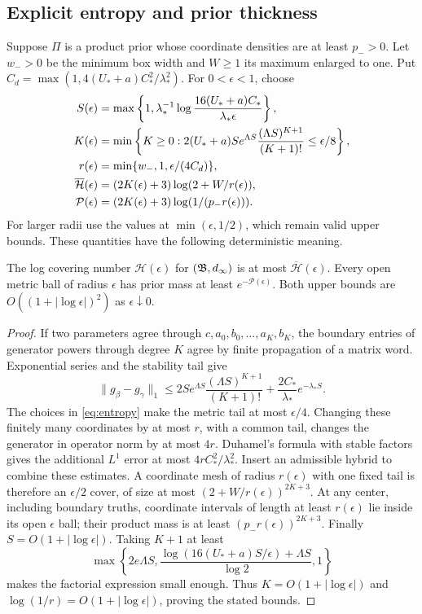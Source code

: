 \subsection{Explicit entropy and prior thickness}
Suppose $\Pi$ is a product prior whose coordinate densities are at least
$p_->0$. Let $w_->0$ be
the minimum box width and $W\ge1$ its maximum enlarged to one. Put
$C_d=\max(1,4(U_*+a)C_*^2/\lambda_*^2)$. For $0<\epsilon<1$, choose
\begin{align}
 S(\epsilon)&=\max\left\{1,
 \lambda_*^{-1}\log\frac{16(U_*+a)C_*}{\lambda_*\epsilon}\right\},\notag\\
 K(\epsilon)&=\min\left\{K\ge0:
 2(U_*+a)S e^{\Lambda S}\frac{(\Lambda S)^{K+1}}{(K+1)!}
                  \le\epsilon/8\right\},\notag\\
 r(\epsilon)&=\min\{w_-,1,\epsilon/(4C_d)\},\notag\\
 \overline{\mathcal H}(\epsilon)&=(2K(\epsilon)+3)
                       \log(2+W/r(\epsilon)),\notag\\
 \mathcal P(\epsilon)&=(2K(\epsilon)+3)\log(1/(p_-r(\epsilon))).
 \label{eq:entropy}
\end{align}
For larger radii use the values at $\min(\epsilon,1/2)$, which remain valid
upper bounds. These quantities have the following deterministic meaning.

\begin{lemma}
\label{lem:entropy}
The log covering number $\mathcal H(\epsilon)$ for $(\mathfrak B,d_\infty)$ is at
most $\overline{\mathcal H}(\epsilon)$. Every open metric ball of radius
$\epsilon$ has prior mass at least $e^{-\mathcal P(\epsilon)}$.
Both upper bounds are $O((1+|\log\epsilon|)^2)$ as $\epsilon\downarrow0$.
\end{lemma}
\begin{proof}
If two parameters agree through $c,a_0,b_0,\ldots,a_K,b_K$, the boundary
entries of generator powers through degree $K$ agree by finite propagation of
a matrix word. Exponential series and the stability tail give
\[
 \|g_\beta-g_\gamma\|_1\le
 2S e^{\Lambda S}\frac{(\Lambda S)^{K+1}}{(K+1)!}
            +\frac{2C_*}{\lambda_*}e^{-\lambda_*S}.
\]
The choices in \eqref{eq:entropy} make the metric tail at most $\epsilon/4$.
Changing these finitely many coordinates by at most $r$, with a common tail,
changes the generator in operator norm by at most $4r$. Duhamel's formula
with stable factors gives the additional $L^1$ error at most
$4rC_*^2/\lambda_*^2$. Insert an admissible hybrid to combine these estimates.
A coordinate mesh of radius $r(\epsilon)$ with one fixed tail is therefore an
$\epsilon/2$ cover, of size at most
$(2+W/r(\epsilon))^{2K+3}$. At any center, including boundary truths,
coordinate intervals of length at least $r(\epsilon)$ lie inside its open
$\epsilon$ ball; their product mass is at least $(p_-r(\epsilon))^{2K+3}$.
Finally $S=O(1+|\log\epsilon|)$. Taking $K+1$ at least
\[
 \max\left\{2e\Lambda S,
 \frac{\log(16(U_*+a)S/\epsilon)+\Lambda S}{\log2},1\right\}
\]
makes the factorial expression small enough. Thus $K=O(1+|\log\epsilon|)$
and $\log(1/r)=O(1+|\log\epsilon|)$, proving the stated bounds.
\end{proof}

